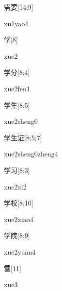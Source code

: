 \begin{verbete}[xu1yao4]{需要}[14;9]
\begin{pronuncia}{xu1yao4}
\end{pronuncia}
\end{verbete}

\begin{verbete}[xue2]{学}[8]
\begin{pronuncia}{xue2}
\end{pronuncia}
\end{verbete}

\begin{verbete}{学分}[8;4]
\begin{pronuncia}{xue2fen1}
\end{pronuncia}
\end{verbete}

\begin{verbete}{学生}[8;5]
\begin{pronuncia}{xue2sheng0}
\end{pronuncia}
\end{verbete}

\begin{verbete}{学生证}[8;5;7]
\begin{pronuncia}[\\]{xue2sheng0zheng4}
\end{pronuncia}
\end{verbete}

\begin{verbete}[xue2xi2]{学习}[8;3]
\begin{pronuncia}{xue2xi2}
\end{pronuncia}
\end{verbete}

\begin{verbete}{学校}[8;10]
\begin{pronuncia}{xue2xiao4}
\end{pronuncia}
\end{verbete}

\begin{verbete}{学院}[8;9]
\begin{pronuncia}{xue2yuan4}
\end{pronuncia}
\end{verbete}

\begin{verbete}[xue3]{雪}[11]
\begin{pronuncia}{xue3}
\end{pronuncia}
\end{verbete}

